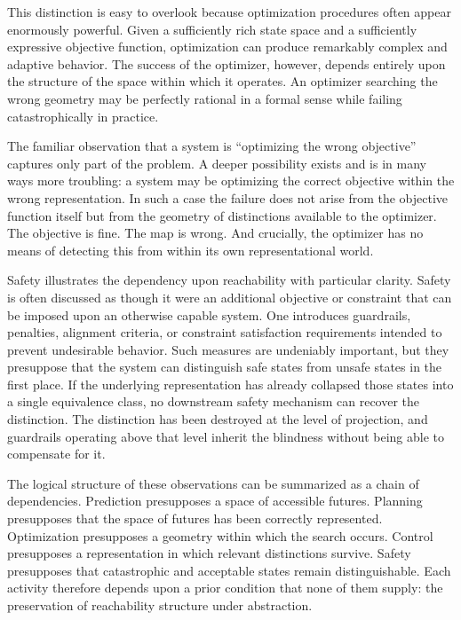 \documentclass[12pt,a4paper]{article}
\theoremstyle{plain}
\theoremstyle{definition}
\theoremstyle{remark}
\begin{document}
This distinction is easy to overlook because optimization procedures often
appear enormously powerful. Given a sufficiently rich state space and a
sufficiently expressive objective function, optimization can produce
remarkably complex and adaptive behavior. The success of the optimizer,
however, depends entirely upon the structure of the space within which it
operates. An optimizer searching the wrong geometry may be perfectly rational
in a formal sense while failing catastrophically in practice.

The familiar observation that a system is ``optimizing the wrong objective''
captures only part of the problem. A deeper possibility exists and is in many
ways more troubling: a system may be optimizing the correct objective within
the wrong representation. In such a case the failure does not arise from the
objective function itself but from the geometry of distinctions available to
the optimizer. The objective is fine. The map is wrong. And crucially, the
optimizer has no means of detecting this from within its own representational
world.

Safety illustrates the dependency upon reachability with particular clarity.
Safety is often discussed as though it were an additional objective or
constraint that can be imposed upon an otherwise capable system. One
introduces guardrails, penalties, alignment criteria, or constraint
satisfaction requirements intended to prevent undesirable behavior. Such
measures are undeniably important, but they presuppose that the system can
distinguish safe states from unsafe states in the first place. If the
underlying representation has already collapsed those states into a single
equivalence class, no downstream safety mechanism can recover the distinction.
The distinction has been destroyed at the level of projection, and guardrails
operating above that level inherit the blindness without being able to
compensate for it.

The logical structure of these observations can be summarized as a chain of
dependencies. Prediction presupposes a space of accessible futures.
Planning presupposes that the space of futures has been correctly
represented. Optimization presupposes a geometry within which the search
occurs. Control presupposes a representation in which relevant distinctions
survive. Safety presupposes that catastrophic and acceptable states remain
distinguishable. Each activity therefore depends upon a prior condition that
none of them supply: the preservation of reachability structure under
abstraction.
\end{document}
